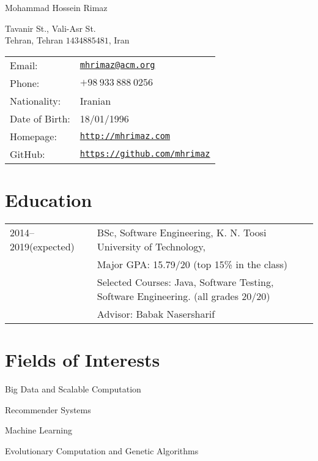 \documentclass[letterpaper]{article}
\def\name{Mohammad Hossein Rimaz}
\renewenvironment{itemize}{
  \begin{list}{}{
    \setlength{\leftmargin}{1.5em}
  }
}{
  \end{list}
}
\begin{document}
{\huge \name}


\vspace{0.25in}

\begin{minipage}{0.45\linewidth}
  Tavanir St., Vali-Asr St. \\
  Tehran, Tehran $1434885481$, Iran
\end{minipage}
\begin{minipage}{0.45\linewidth}
  \begin{tabular}{ll}
    Email: & \href{mailto:mhrimaz@acm.org}{\tt mhrimaz@acm.org} \\
    Phone: & $+98~933~888~0256$ \\
    Nationality: & Iranian \\
    Date of Birth: & 18/01/1996  \\
    Homepage: & \href{http://mhrimaz.com}{\tt http://mhrimaz.com} \\
    GitHub: & \href{https://mhrimaz.github.io}{\tt https://github.com/mhrimaz} 
  \end{tabular}
\end{minipage}


\section*{Education}

{\renewcommand{\arraystretch}{1.2}
\begin{tabular}{l l}
2014--2019(expected) & BSc, Software Engineering, K. N. Toosi University of Technology,\\
 & Major GPA: 15.79/20 (top 15\% in the class) \\
 & Selected Courses: Java, Software Testing, Software Engineering. (all grades 20/20)\\
 & Advisor: Babak Nasersharif
\end{tabular}
}

\section*{Fields of Interests}

\begin{itemize}
	\item Big Data and Scalable Computation
	\item Recommender Systems
	\item Machine Learning
	\item Evolutionary Computation and Genetic Algorithms
\end{itemize}
\end{document}

